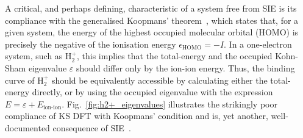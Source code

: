 {%


A critical, 
and perhaps defining, 
characteristic of a system free from SIE is 
its compliance with {the generalised} Koopmans'  
theorem~\cite{KOOPMANS1934104,PhysRev.123.420,PhysRevB.82.115121,PhysRevB.90.075135}, 
which states that, 
{for a given system,} 
the energy of the 
highest occupied molecular orbital (HOMO) 
is precisely the negative of the ionisation energy 
$\epsilon_\text{HOMO}=-I$.
%
In a one-electron system, 
such as  H$_2^+$, 
this implies that the total-energy and the 
occupied Kohn-Sham eigenvalue $\varepsilon$
should differ only by the ion-ion energy.
%
Thus, the binding curve of H$_2^+$ 
should be equivalently accessible 
by calculating either the total-energy directly, 
or by using the occupied eigenvalue 
with the expression  
$E = \varepsilon + E_\textrm{ion-ion}$.
%
Fig.~\ref{fig:h2+_eigenvalues} 
illustrates the strikingly poor 
compliance of KS DFT with 
Koopmans' condition and is, 
yet another, 
well-documented 
consequence of SIE~\cite{PhysRevB.82.115121,
doi:10.1063/1.3269030,
doi:10.1021/ct8005419,
PhysRevB.90.075135,
PhysRevB.81.205209}.
%
%
%

}

